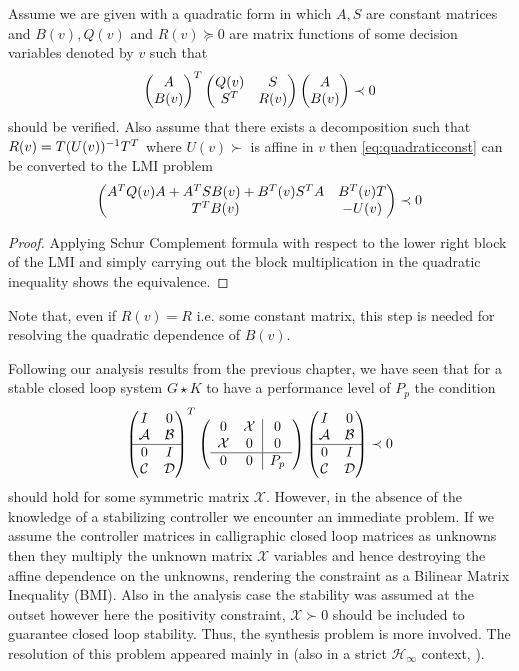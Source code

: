 \begin{lem} Assume we are given with a quadratic form in which $A,S$ are constant matrices and $B(v),Q(v)$ and $R(v)\succeq 0$ are matrix functions 
of some decision variables denoted by $v$ such that
\begin{equation}
\begin{pmatrix}A\\B(v)\end{pmatrix}^T\begin{pmatrix}Q(v) &S\\S^T &R(v)\end{pmatrix}\begin{pmatrix}A\\B(v)\end{pmatrix} \prec 0
\label{eq:quadraticconst}
\end{equation}
should be verified. Also assume that there exists a decomposition such that $R(v) = T(U(v))^{-1}T^T$ where $U(v)\succ$ is affine in $v$ then 
\eqref{eq:quadraticconst} can be converted to the LMI problem
\begin{equation}
\begin{pmatrix}A^TQ(v)A + A^TSB(v) + B^T(v)S^TA &B^T(v)T\\T^TB(v) &-U(v)\end{pmatrix}\prec 0
\label{eq:linearizedconst}
\end{equation}
\end{lem}

\begin{proof} Applying Schur Complement formula with respect to the lower right block of the LMI and simply carrying out the block
multiplication in the quadratic inequality shows the equivalence. 
\end{proof}
Note that, even if $R(v)=R$ i.e. some constant matrix, this step is needed for resolving the quadratic dependence of $B(v)$. 

Following our analysis results from the previous chapter, we have seen that for a stable closed loop system $G\star K$ to have 
a performance level of $P_p$ the condition
\[
\begin{pmatrix}I&0\\\mathcal{A}&\mathcal{B}\\\hline 0&I\\\mathcal{C}&\mathcal{D}\end{pmatrix}^T
\left(
\begin{array}{cc|c}
	0&\mathcal{X}&0\\\mathcal{X}&0&0\\\hline 0&0&P_p
\end{array}
\right)
\begin{pmatrix}I&0\\\mathcal{A}&\mathcal{B}\\\hline 0&I\\\mathcal{C}&\mathcal{D}\end{pmatrix}\prec 0
\]
should hold for some symmetric matrix $\mathcal{X}$. However, in the absence of the knowledge of a stabilizing controller we encounter
an immediate problem. If we assume the controller matrices in calligraphic closed loop matrices as unknowns then they multiply the unknown
matrix $\mathcal{X}$ variables and hence destroying the affine dependence on the unknowns, rendering the constraint as a Bilinear Matrix 
Inequality (BMI). Also in the analysis case the stability was assumed at the outset however here the positivity constraint,
$\mathcal{X}\succ 0$ should be included to guarantee closed loop stability. Thus, the synthesis problem is more involved. The resolution of 
this problem appeared mainly in \cite{scherermulti,izumi} (also in a strict $\mathcal{H}_\infty$ context, \cite{gahapk,gahinet96}).

